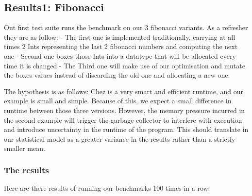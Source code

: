 \documentclass[
]{article}
\begin{document}
\hypertarget{results1-fibonacci}{%
\subsection{Results1: Fibonacci}\label{results1-fibonacci}}

Out first test suite runs the benchmark on our 3 fibonacci variants. As
a refresher they are as follow: - The first one is implemented
traditionally, carrying at all times 2 Ints representing the last 2
fibonacci numbers and computing the next one - Second one boxes those
Ints into a datatype that will be allocated every time it is changed -
The Third one will make use of our optimisation and mutate the boxes
values instead of discarding the old one and allocating a new one.

The hypothesis is as follows: Chez is a very smart and efficient
runtime, and our example is small and simple. Because of this, we expect
a small difference in runtime between those three versions. However, the
memory pressure incurred in the second example will trigger the garbage
collector to interfere with execution and introduce uncertainty in the
runtime of the program. This should translate in our statistical model
as a greater variance in the results rather than a strictly smaller
mean.

\hypertarget{the-results}{%
\subsubsection{The results}\label{the-results}}

Here are there results of running our benchmarks 100 times in a row:
\end{document}
